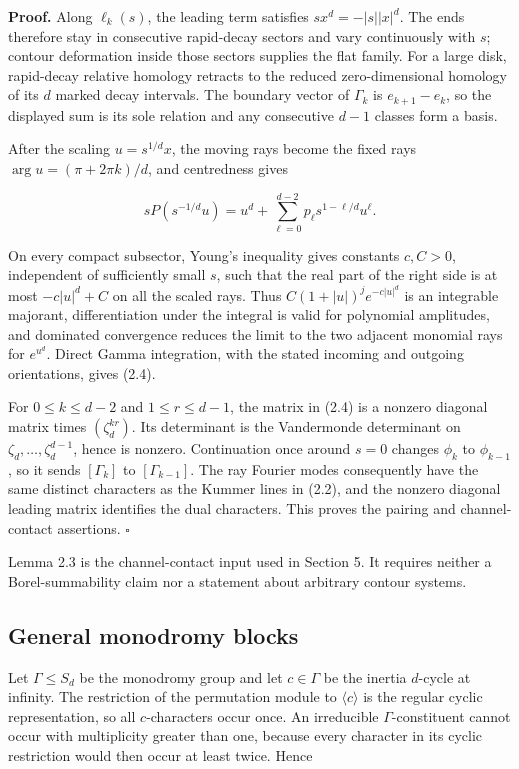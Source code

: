 \documentclass[
  11pt,
  a4paper,
]{amsart}
\begin{document}
\textbf{Proof.} Along \(\ell_k(s)\), the leading term satisfies
\(sx^d=-|s||x|^d\). The ends therefore stay in consecutive rapid-decay
sectors and vary continuously with \(s\); contour deformation inside
those sectors supplies the flat family. For a large disk, rapid-decay
relative homology retracts to the reduced zero-dimensional homology of
its \(d\) marked decay intervals. The boundary vector of \(\Gamma_k\) is
\(e_{k+1}-e_k\), so the displayed sum is its sole relation and any
consecutive \(d-1\) classes form a basis.

After the scaling \(u=s^{1/d}x\), the moving rays become the fixed rays
\(\arg u=(\pi+2\pi k)/d\), and centredness gives

\[
sP(s^{-1/d}u)
=u^d+\sum_{\ell=0}^{d-2}p_\ell s^{1-\ell/d}u^\ell.
\]

On every compact subsector, Young's inequality gives constants
\(c,C>0\), independent of sufficiently small \(s\), such that the real
part of the right side is at most \(-c|u|^d+C\) on all the scaled rays.
Thus \(C(1+|u|)^j e^{-c|u|^d}\) is an integrable majorant,
differentiation under the integral is valid for polynomial amplitudes,
and dominated convergence reduces the limit to the two adjacent monomial
rays for \(e^{u^d}\). Direct Gamma integration, with the stated incoming
and outgoing orientations, gives (2.4).

For \(0\le k\le d-2\) and \(1\le r\le d-1\), the matrix in (2.4) is a
nonzero diagonal matrix times \((\zeta_d^{kr})\). Its determinant is the
Vandermonde determinant on \(\zeta_d,\ldots,\zeta_d^{d-1}\), hence is
nonzero. Continuation once around \(s=0\) changes \(\phi_k\) to
\(\phi_{k-1}\), so it sends \([\Gamma_k]\) to \([\Gamma_{k-1}]\). The
ray Fourier modes consequently have the same distinct characters as the
Kummer lines in (2.2), and the nonzero diagonal leading matrix
identifies the dual characters. This proves the pairing and
channel-contact assertions. \(\square\)

Lemma 2.3 is the channel-contact input used in Section 5. It requires
neither a Borel-summability claim nor a statement about arbitrary
contour systems.

\subsection{General monodromy blocks}

Let \(\Gamma\le S_d\) be the monodromy group and let \(c\in\Gamma\) be
the inertia \(d\)-cycle at infinity. The restriction of the permutation
module to \(\langle c\rangle\) is the regular cyclic representation, so
all \(c\)-characters occur once. An irreducible \(\Gamma\)-constituent
cannot occur with multiplicity greater than one, because every character
in its cyclic restriction would then occur at least twice. Hence
\end{document}
